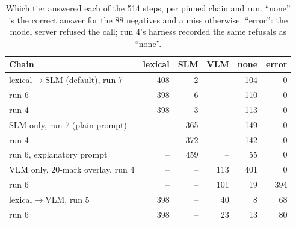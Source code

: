 \documentclass[conference]{IEEEtran}
\begin{document}
\begin{table}[t]
  \centering\scriptsize\setlength{\tabcolsep}{4pt}
  \caption{Which tier answered each of the 514 steps, per pinned chain and run. ``none'' is the correct answer for the 88 negatives and a miss otherwise. ``error'': the model server refused the call; run 4's harness recorded the same refusals as ``none''.}
  \label{tab:tiers}
  \begin{tabular}{@{}lrrrrr@{}}
    \toprule
    Chain & lexical & SLM & VLM & none & error \\
    \midrule
    lexical$\rightarrow$SLM (default), run 7 & 408 & 2 & -- & 104 & 0 \\
    \quad run 6 & 398 & 6 & -- & 110 & 0 \\
    \quad run 4 & 398 & 3 & -- & 113 & 0 \\
    SLM only, run 7 (plain prompt) & -- & 365 & -- & 149 & 0 \\
    \quad run 4 & -- & 372 & -- & 142 & 0 \\
    \quad run 6, explanatory prompt & -- & 459 & -- & 55 & 0 \\
    VLM only, 20-mark overlay, run 4 & -- & -- & 113 & 401 & 0 \\
    \quad run 6 & -- & -- & 101 & 19 & 394 \\
    lexical$\rightarrow$VLM, run 5 & 398 & -- & 40 & 8 & 68 \\
    \quad run 6 & 398 & -- & 23 & 13 & 80 \\
    \bottomrule
  \end{tabular}
\end{table}
\end{document}
